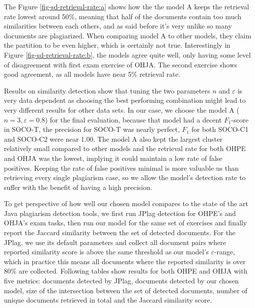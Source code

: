 \noindent
The Figure \ref{fig-sd-retrieval-rate:a} shows how the the model A keeps the retrieval rate lowest around 50\%, meaning that half of the documents contain too much similarities between each others, and as said before it's very unlike so many documents are plagiarized. When comparing model A to other models, they claim the partition to be even higher, which is certainly not true. Interestingly in Figure \ref{fig-sd-retrieval-rate:b}, the models agree quite well, only having some level of disagreement with first exam exercise of OHJA. The second exercise shows good agreement, as all models have near 5\% retrieval rate.

Results on similarity detection show that tuning the two parameters $n$ and $\varepsilon$ is very data dependent as choosing the best performing combination might lead to very different results for other data sets. In our case, we choose the model A ($n=3, \varepsilon=0.8$) for the final evaluation, because that model had a decent $F_1$-score in SOCO-T, the precision for SOCO-T was nearly perfect, $F_1$ for both SOCO-C1 and SOCO-C2 were near 1.00. The model A also kept the largest cluster relatively small compared to other models and the retrieval rate for both OHPE and OHJA was the lowest, implying it could maintain a low rate of false positives. Keeping the rate of false positives minimal is more valuable us than retrieving every single plagiarism case, so we allow the model's detection rate to suffer with the benefit of having a high precision.  

To get perspective of how well our chosen model compares to the state of the art Java plagiarism detection tools, we first run JPlag detection for OHPE's and OHJA's exam tasks, then run our model for the same set of exercises and finally report the Jaccard similarity between the set of detected documents. For the JPlag, we use its default parameters and collect all document pairs where reported similarity score is above the same threshold as our model's $\varepsilon$-range, which in practice this means all documents where the reported similarity is over 80\% are collected. Following tables show results for both OHPE and OHJA with five metrics: documents detected by JPlag, documents detected by our chosen model, size of the intersection between the set of detected documents, number of unique documents retrieved in total and the Jaccard similarity score.

